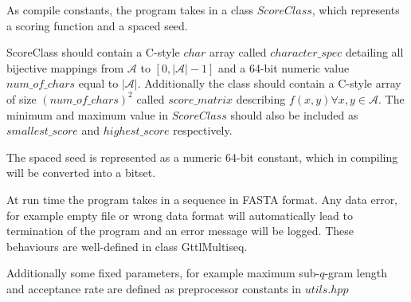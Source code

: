 As compile constants, the program takes in a class $ScoreClass$, which represents a scoring function and a spaced seed. 

ScoreClass should contain a C-style $char$ array called $character\_spec$ detailing all bijective mappings from $\mathcal{A}$ to $[0,|\mathcal{A}|-1]$ and a 64-bit numeric value $num\_of\_chars$ equal to $|\mathcal{A}|$. Additionally the class should contain a C-style array of size $(num\_of\_chars)^2$ called $score\_matrix$ describing $f(x,y) \forall x,y\in \mathcal{A}$. The minimum and maximum value in $ScoreClass$ should also be included as $smallest\_score$ and $highest\_score$ respectively.

The spaced seed is represented as a numeric 64-bit constant, which in compiling will be converted into a bitset.

At run time the program takes in a sequence in FASTA format. Any data error, for example empty file or wrong data format will automatically lead to termination of the program and an error message will be logged. These behaviours are well-defined in class GttlMultiseq.

Additionally some fixed parameters, for example maximum sub-$q$-gram length and acceptance rate are defined as preprocessor constants in $utils.hpp$